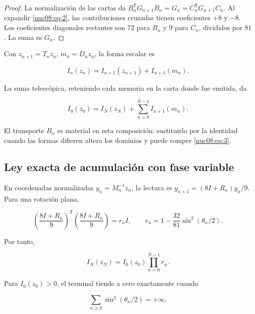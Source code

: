 \begin{proof}
La normalización de las cartas da
\(B_n^\mathsf TG_{n+1}B_n=G_n=C_n^\mathsf TG_{n+1}C_n\).
Al expandir \eqref{nuc08:eq:2}, las contribuciones cruzadas tienen coeficientes \(+8\) y \(-8\). Los coeficientes diagonales restantes son \(72\) para \(B_n\) y \(9\) para \(C_n\), divididos por \(81\). La suma es \(G_n\).
\end{proof}

Con \(z_{n+1}=T_nz_n\), \(m_n=D_nz_n\), la forma escalar es

\begin{equation}
\boxed{I_n(z_n)=I_{n+1}(z_{n+1})+I_{n+1}(m_n).}
\label{nuc08:eq:4}
\end{equation}

La suma telescópica, reteniendo cada memoria en la carta donde fue emitida, da

\begin{equation}
I_0(z_0)=I_N(z_N)+\sum_{n=0}^{N-1}I_{n+1}(m_n).
\label{nuc08:eq:5}
\end{equation}

El transporte \(B_n\) es material en esta composición: sustituirlo por la identidad cuando las formas difieren altera los dominios y puede romper \eqref{nuc08:eq:3}.

\subsection{Ley exacta de acumulación con fase variable}

En coordenadas normalizadas \(y_n=M_n^{-1}z_n\), la lectura es
\(y_{n+1}=(8I+R_n)y_n/9\). Para una rotación plana,

\begin{equation}
\left(\frac{8I+R_n}{9}\right)^\mathsf T
\left(\frac{8I+R_n}{9}\right)=r_n I,\qquad
r_n=1-\frac{32}{81}\sin^2(\theta_n/2).
\label{nuc08:eq:6}
\end{equation}

Por tanto,

\begin{equation}
I_N(z_N)=I_0(z_0)\prod_{n=0}^{N-1}r_n.
\label{nuc08:eq:7}
\end{equation}

\begin{theorem}
Para \(I_0(z_0)>0\), el terminal tiende a cero exactamente cuando

\begin{equation}
\sum_{n\ge0}\sin^2(\theta_n/2)=+\infty.
\label{nuc08:eq:8}
\end{equation}
\end{theorem}

